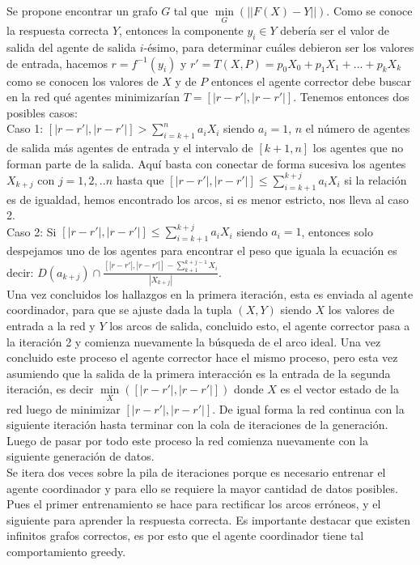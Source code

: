        Se propone encontrar un grafo $G$ tal que $\underset{G}{\min}(||F(X)-Y||)$. Como se conoce la respuesta correcta $Y$, entonces la componente $y_i \in Y$ debería ser el valor de salida del agente de salida $i$-ésimo, para determinar cuáles debieron ser los valores de entrada, hacemos $r=f^{-1}(y_i)$ y $r'=T(X,P)=p_0X_0 + p_1X_1 +...+p_kX_k$ como se conocen los valores de $X$ y de $P$
        entonces el agente corrector debe buscar en la red qué agentes minimizarían $T=[|r-r'|,|r-r'|]$. Tenemos entonces dos posibles casos: \\

        Caso 1: $[|r-r'|,|r-r'|] > \sum_{i=k+1}^{n} a_iX_i$ siendo $a_i=1$, $n$ el número de agentes de salida más agentes de entrada y el intervalo de $[k+1,n]$ los agentes
        que no forman parte de la salida. Aquí basta con conectar de forma sucesiva los agentes $X_{k+j}$ con $j=1,2,..n$ hasta que $[|r-r'|,|r-r'|] \leqslant \sum_{i=k+1}^{k+j} a_iX_i$ si la relación es de igualdad, hemos encontrado los arcos,
         si es menor estricto, nos lleva al caso 2.\\

        Caso 2: Si $[|r-r'|,|r-r'|] \leqslant \sum_{i=k+1}^{k+j} a_iX_i$ siendo $a_i=1$, entonces solo despejamos uno de los agentes para encontrar el peso que iguala la ecuación
        es decir: $D(a_{k+j}) \cap \frac{[|r-r'|,|r-r'|] - \sum_{k+1}^{k+j-1} X_i}{|X_{k+j}|}$.\\

        Una vez concluidos los hallazgos en la primera iteración, esta es enviada al agente coordinador, para que se ajuste dada la tupla $(X,Y)$ siendo
        $X$ los valores de entrada a la red y $Y$ los arcos de salida, concluido esto, el agente corrector pasa a la iteración 2 y comienza nuevamente la búsqueda de el arco ideal. Una vez concluido este proceso
        el agente corrector hace el mismo proceso, pero esta vez asumiendo que la salida de la primera interacción es la entrada de la segunda iteración, es decir $\underset{X}{\min}([|r-r'|,|r-r'|])$ donde $X$ es el vector estado de la red luego de minimizar $[|r-r'|,|r-r'|]$.
        De igual forma la red continua con la siguiente iteración hasta terminar con la cola de iteraciones de la generación. Luego de pasar por todo este proceso la red comienza nuevamente con la siguiente generación de datos. \\

        Se itera dos veces sobre la pila de iteraciones porque es necesario entrenar el agente coordinador y para ello se requiere la mayor cantidad de datos posibles. Pues el primer entrenamiento se hace para rectificar los arcos erróneos, y el siguiente para aprender la respuesta correcta.
        Es importante destacar que existen infinitos grafos correctos, es por esto que el agente coordinador tiene tal comportamiento greedy.

